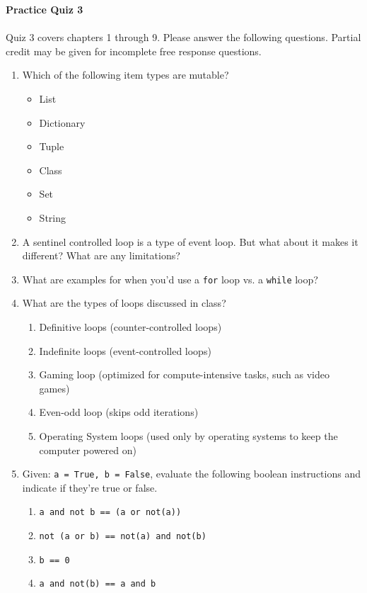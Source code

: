 \documentclass[letter,10pt]{article}
\begin{document}
\huge
\textbf{Practice Quiz 3}
\normalsize

\paragraph{}Quiz 3 covers chapters 1 through 9. Please answer the following questions. Partial credit may be given for incomplete free response questions.

\begin{enumerate}
	\item Which of the following item types are mutable?
    \begin{itemize}
        \item List
        \item Dictionary
        \item Tuple
        \item Class
        \item Set
        \item String
    \end{itemize}

    \item A sentinel controlled loop is a type of event loop. But what about it makes it different? What are any limitations?

    \item What are examples for when you'd use a \texttt{for} loop vs. a \texttt{while} loop?

    \item What are the types of loops discussed in class?
    \begin{enumerate}
        \item Definitive loops (counter-controlled loops)
		\item Indefinite loops (event-controlled loops)
		\item Gaming loop (optimized for compute-intensive tasks, such as video games)
		\item Even-odd loop (skips odd iterations)
		\item Operating System loops (used only by operating systems to keep the computer powered on)
    \end{enumerate}

    \item Given: \verb|a = True, b = False|, evaluate the following boolean instructions and indicate if they're true or false.
    \begin{enumerate}
        \item \verb|a and not b == (a or not(a))|
        \item \verb|not (a or b) == not(a) and not(b)|
        \item \verb|b == 0|
        \item \verb|a and not(b) == a and b|
    \end{enumerate}


\end{enumerate}
\end{document}
